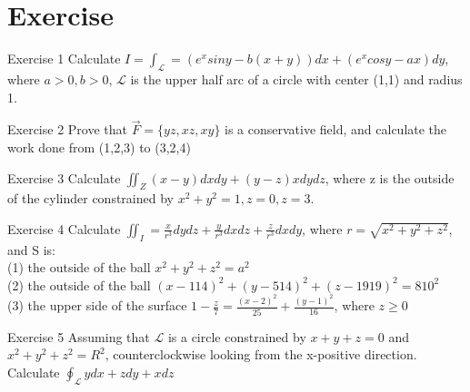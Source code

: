 \documentclass{beamer}
\begin{document}
    \section{Exercise}
    \begin{frame}{Exercise 1}
    Calculate $I=\int_{\mathcal{L}}=(e^xsiny-b(x+y))dx+(e^x cosy-ax)dy$, where $a>0,b>0$, $\mathcal{L}$ is the upper half arc of a circle with center (1,1) and radius 1.
    
        
    \end{frame}
    \begin{frame}{Exercise 2}
    Prove that $\Vec{F}=\{yz,xz,xy\}$ is a conservative field, and calculate the work done from (1,2,3) to (3,2,4)
        
    \end{frame}
    \begin{frame}{Exercise 3}
    Calculate $\iint_{Z}(x-y)dxdy+(y-z)xdydz$, where z is the outside of the cylinder constrained by $x^2+y^2=1, z=0,z=3$.
        
    \end{frame}
    \begin{frame}{Exercise 4}
    Calculate $\iint_I=\frac{x}{r^3}dydz+\frac{y}{r^3}dxdz+\frac{z}{r^3}dxdy$, where $r=\sqrt{x^2+y^2+z^2}$, and S is:\\
        (1) the outside of the ball $x^2+y^2+z^2=a^2$\\
        (2) the outside of the ball $(x-114)^2+(y-514)^2+(z-1919)^2=810^2$\\
        (3) the upper side of the surface $1-\frac{z}{7}=\frac{(x-2)^2}{25}+\frac{(y-1)^2}{16}$, where $z\geq 0$
        
    \end{frame}
    \begin{frame}{Exercise 5}
    Assuming that $\mathcal{L}$ is a circle constrained by $x+y+z=0$ and $x^2+y^2+z^2=R^2$, counterclockwise looking from the x-positive direction. Calculate $\oint_{\mathcal{L}}ydx+zdy+xdz$
        
    \end{frame}
\appendix
\end{document}
